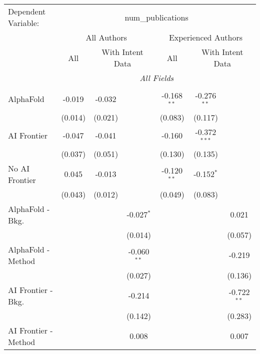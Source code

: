 \begingroup
\centering
\begin{tabular}{lcccccc}
   \tabularnewline \midrule \midrule
   Dependent Variable: & \multicolumn{6}{c}{num\_publications}\\
 & \multicolumn{3}{c}{All Authors} & \multicolumn{3}{c}{Experienced Authors} \\
\cmidrule(lr){2-4} \cmidrule(lr){5-7}
 & \multicolumn{1}{c}{All} & \multicolumn{2}{c}{With Intent Data} & \multicolumn{1}{c}{All} & \multicolumn{2}{c}{With Intent Data} \\
\cmidrule(lr){2-2} \cmidrule(lr){3-4} \cmidrule(lr){5-5} \cmidrule(lr){6-7}
 & \multicolumn{6}{c}{\textit{All Fields}} \\ \\
   AlphaFold               & -0.019    & -0.032  &               & -0.168$^{**}$ & -0.276$^{**}$  &   \\   
                           & (0.014)   & (0.021) &               & (0.083)       & (0.117)        &   \\   
   AI Frontier             & -0.047    & -0.041  &               & -0.160        & -0.372$^{***}$ &   \\   
                           & (0.037)   & (0.051) &               & (0.130)       & (0.135)        &   \\   
   No AI Frontier          & 0.045     & -0.013  &               & -0.120$^{**}$ & -0.152$^{*}$   &   \\   
                           & (0.043)   & (0.012) &               & (0.049)       & (0.083)        &   \\   
   AlphaFold - Bkg.        &           &         & -0.027$^{*}$  &               &                & 0.021\\   
                           &           &         & (0.014)       &               &                & (0.057)\\   
   AlphaFold - Method      &           &         & -0.060$^{**}$ &               &                & -0.219\\   
                           &           &         & (0.027)       &               &                & (0.136)\\   
   AI Frontier - Bkg.      &           &         & -0.214        &               &                & -0.722$^{**}$\\   
                           &           &         & (0.142)       &               &                & (0.283)\\   
   AI Frontier - Method    &           &         & 0.008         &               &                & 0.007\\   

\end{tabular}
